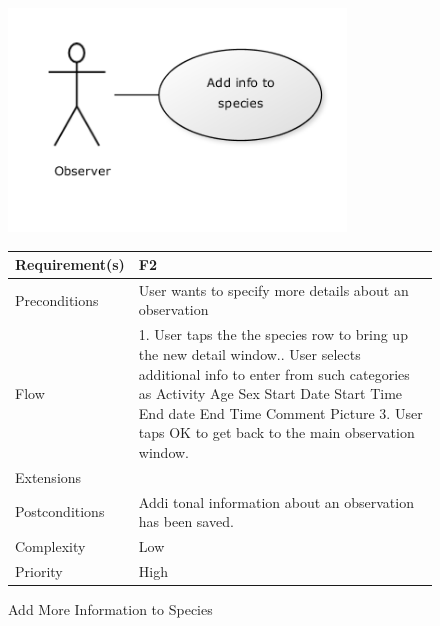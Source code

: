 \begin{figure}
		\centering
		\includegraphics[width=0.8\textwidth]{reqspec/uc/addinfo.png}
		\caption{Add More Information to Species}
		\label{fig:addmore}

\begin{tabular}[t]{|l|p{}|}\hline
	Requirement(s)&F2\\\hline
	Preconditions&User wants to specify more details about an observation\\\hline
	Flow& 1. User taps the the species row to bring up the new detail window.\newline
	2. User selects additional info to enter from such categories as \newline
	Activity \newline
	Age\newline
	Sex\newline
	Start Date\newline
	Start Time\newline
	End date \newline
	End Time \newline
	Comment \newline
	Picture \newline
	3. User taps OK to get back to the main observation window.\\\hline
	Extensions& \\\hline
	Postconditions&Addi tonal information about an observation has been saved.\\\hline
	Complexity&Low\\\hline
	Priority&High\\\hline
\end{tabular}
\end{figure}

